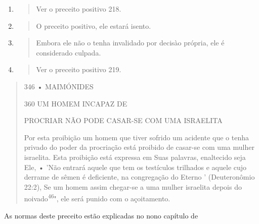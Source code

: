 \begin{enumerate}
\def\labelenumi{\arabic{enumi}.}
\setcounter{enumi}{462}
\item
  \begin{quote}
  Ver o preceito positivo 218.
  \end{quote}
\item
  \begin{quote}
  O preceito positivo, ele estará isento.
  \end{quote}
\item
  \begin{quote}
  Embora ele não o tenha invalidado por decisào própria, ele é
  considerado culpada.
  \end{quote}
\item
  \begin{quote}
  Ver o preceito positivo 219.
  \end{quote}
\end{enumerate}

\begin{quote}
346 • MAIMÓNIDES

360 UM HOMEM INCAPAZ DE

PROCRIAR NÃO PODE CASAR-SE COM UMA ISRAELITA

Por esta proibição um homem que tiver sofrido um acidente que o tenha
privado do poder da procriação está proibido de casar-se com uma mu­lher
israelita. Esta proibição está expressa em Suas palavras, enaltecido
seja Ele, • 'Não entrará aquele que tem os testículos trilhados e aquele
cujo derrame de sêmen é deficiente, na congregação do Eterno '
(Deuteronômio 22:2), Se um homem assim chegar-se a uma mulher israelita
depois do noivado\textsuperscript{46}", ele será punido com o
açoitamento.
\end{quote}

As normas deste preceito estão explicadas no nono capítulo de

